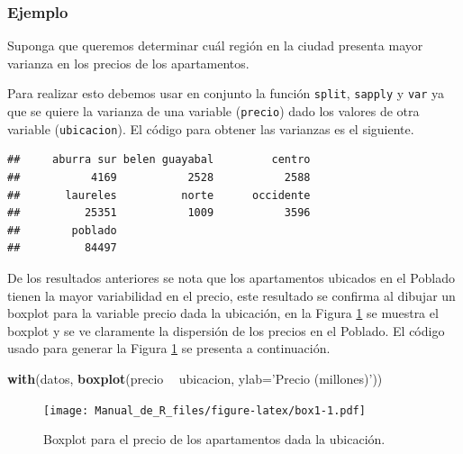 \documentclass[10pt,]{krantz}
\makeatletter
\newenvironment{Shaded}{\begin{snugshade}}{\end{snugshade}}
\newcommand{\KeywordTok}[1]{\textcolor[rgb]{0.13,0.29,0.53}{\textbf{#1}}}
\newcommand{\DataTypeTok}[1]{\textcolor[rgb]{0.13,0.29,0.53}{#1}}
\newcommand{\StringTok}[1]{\textcolor[rgb]{0.31,0.60,0.02}{#1}}
\newcommand{\OperatorTok}[1]{\textcolor[rgb]{0.81,0.36,0.00}{\textbf{#1}}}
\newcommand{\NormalTok}[1]{#1}
\newenvironment{kframe}{%
\medskip{}
\setlength{\fboxsep}{.8em}
 \def\at@end@of@kframe{}%
 \ifinner\ifhmode%
  \def\at@end@of@kframe{\end{minipage}}%
  \begin{minipage}{\columnwidth}%
 \fi\fi%
 \def\FrameCommand##1{\hskip\@totalleftmargin \hskip-\fboxsep
 \colorbox{shadecolor}{##1}\hskip-\fboxsep
     \hskip-\linewidth \hskip-\@totalleftmargin \hskip\columnwidth}%
 \MakeFramed {\advance\hsize-\width
   \@totalleftmargin\z@ \linewidth\hsize
   \@setminipage}}%
 {\par\unskip\endMakeFramed%
 \at@end@of@kframe}
\renewenvironment{Shaded}{\begin{kframe}}{\end{kframe}}
\makeatother
\begin{document}
\subsubsection*{Ejemplo}\label{ejemplo-24}

Suponga que queremos determinar cuál región en la ciudad presenta mayor
varianza en los precios de los apartamentos.

Para realizar esto debemos usar en conjunto la función \texttt{split},
\texttt{sapply} y \texttt{var} ya que se quiere la varianza de una
variable (\texttt{precio}) dado los valores de otra variable
(\texttt{ubicacion}). El código para obtener las varianzas es el
siguiente.

\begin{Shaded}
\end{Shaded}

\begin{verbatim}
##     aburra sur belen guayabal         centro 
##           4169           2528           2588 
##       laureles          norte      occidente 
##          25351           1009           3596 
##        poblado 
##          84497
\end{verbatim}

De los resultados anteriores se nota que los apartamentos ubicados en el
Poblado tienen la mayor variabilidad en el precio, este resultado se
confirma al dibujar un boxplot para la variable precio dada la
ubicación, en la Figura \ref{fig:box1} se muestra el boxplot y se ve
claramente la dispersión de los precios en el Poblado. El código usado
para generar la Figura \ref{fig:box1} se presenta a continuación.

\begin{Shaded}
\begin{Highlighting}[]
\KeywordTok{with}\NormalTok{(datos, }\KeywordTok{boxplot}\NormalTok{(precio }\OperatorTok{~}\StringTok{ }\NormalTok{ubicacion, }\DataTypeTok{ylab=}\StringTok{'Precio (millones)'}\NormalTok{))}
\end{Highlighting}
\end{Shaded}

\begin{figure}
\centering
\texttt{[image: Manual\_de\_R\_files/figure-latex/box1-1.pdf]}
\caption{\label{fig:box1}Boxplot para el precio de los apartamentos dada la
ubicación.}
\end{figure}
\end{document}
